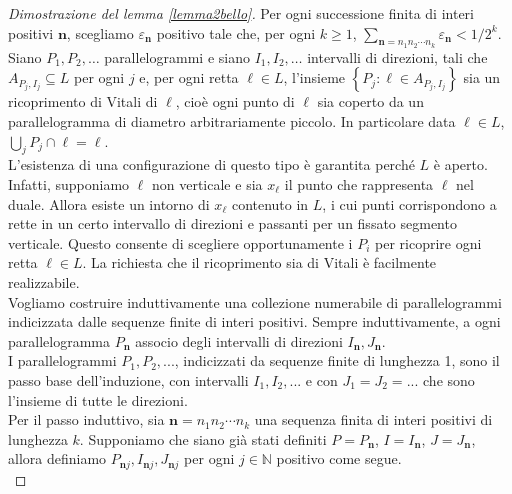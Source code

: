 \documentclass[a4paper, twoside]{article}
\newcommand{\<}{\langle}
\renewcommand{\>}{\rangle}
\begin{document}
\begin{proof}[Dimostrazione del lemma \ref{lemma2bello}]
Per ogni successione finita di interi positivi $\mathbf{n}$, scegliamo $\varepsilon_{\mathbf{n}}$ positivo tale che, per ogni $k\geq 1$, $\sum_{\mathbf{n}=n_{1} n_{2} \cdots n_{k}} \varepsilon_{\mathbf{n}}<1 / 2^{k}$.\\
Siano $P_{1}, P_{2}, \ldots$ parallelogrammi e siano $I_{1}, I_{2}, \ldots$ intervalli di direzioni, tali che $A_{P_{j}, I_{j}} \subseteq L$ per ogni $j$ e, per ogni retta $\ell \in L$, l'insieme $\left\{P_{j}: \ell \in A_{P_{j}, I_{j}}\right\}$ sia un ricoprimento di Vitali di $\ell$, cioè ogni punto di $\ell$ sia coperto da un parallelogramma di diametro arbitrariamente piccolo. In particolare data $\ell \in L$, $ \bigcup_j P_j \cap \ell = \ell $.\\
L'esistenza di una configurazione di questo tipo è garantita perché $L$ è aperto. Infatti, supponiamo $\ell$ non verticale e sia $x_{\ell}$ il punto che rappresenta $\ell$ nel duale. Allora esiste un intorno di $x_{\ell}$ contenuto in $L$, i cui punti corrispondono a rette in un certo intervallo di direzioni e passanti per un fissato segmento verticale. Questo consente di scegliere opportunamente i $P_i$ per ricoprire ogni retta $\ell \in L$. La richiesta che il ricoprimento sia di Vitali è facilmente realizzabile.\\

Vogliamo costruire induttivamente una collezione numerabile di parallelogrammi indicizzata dalle sequenze finite di interi positivi. Sempre induttivamente, a ogni parallelogramma $P_{\mathbf{n}}$ associo degli intervalli di direzioni $I_{\mathbf{n}}, J_{\mathbf{n}}$.\\
I parallelogrammi $P_1, P_2,...$, indicizzati da sequenze finite di lunghezza 1, sono il passo base dell'induzione, con intervalli $I_1, I_2,...$ e con $J_1=J_2=...$ che sono l'insieme di tutte le direzioni.\\
Per il passo induttivo, sia $\mathbf{n}=n_{1} n_{2} \cdots n_{k}$ una sequenza finita di interi positivi di lunghezza $k$. Supponiamo che siano già stati definiti $P=P_{\mathbf{n}}$, $I=I_{\mathbf{n}}$, $J=J_{\mathbf{n}}$, allora definiamo $P_{\mathbf{n} j}, I_{\mathbf{n} j}, J_{\mathbf{n} j}$ per ogni $j \in \mathbb{N}$ positivo come segue.\\


\end{proof}
\end{document}
